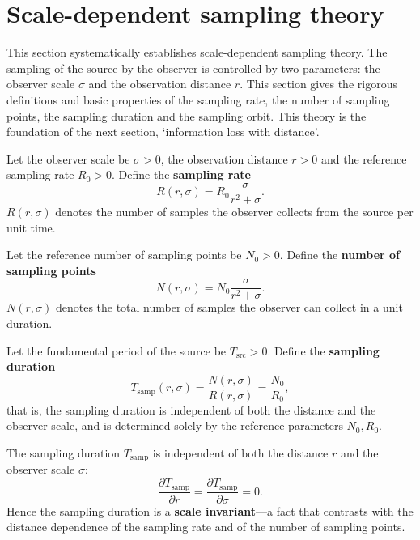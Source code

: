 \section{Scale-dependent sampling theory}
\label{sec:dyn_sampling}

This section systematically establishes scale-dependent sampling theory. The sampling of the source by the observer is controlled by two parameters: the observer scale $\sigma$ and the observation distance $r$. This section gives the rigorous definitions and basic properties of the sampling rate, the number of sampling points, the sampling duration and the sampling orbit. This theory is the foundation of the next section, `information loss with distance'.

\begin{definition}\label{def:dyn_sampling_rate}
Let the observer scale be $\sigma>0$, the observation distance $r>0$ and the reference sampling rate $R_0>0$. Define the \textbf{sampling rate}
\[
R(r,\sigma)=R_0\frac{\sigma}{r^2+\sigma}.
\]
$R(r,\sigma)$ denotes the number of samples the observer collects from the source per unit time.
\end{definition}

\begin{definition}\label{def:dyn_sampling_points}
Let the reference number of sampling points be $N_0>0$. Define the \textbf{number of sampling points}
\[
N(r,\sigma)=N_0\frac{\sigma}{r^2+\sigma}.
\]
$N(r,\sigma)$ denotes the total number of samples the observer can collect in a unit duration.
\end{definition}

\begin{definition}\label{def:dyn_sampling_duration}
Let the fundamental period of the source be $T_{\text{src}}>0$. Define the \textbf{sampling duration}
\[
T_{\text{samp}}(r,\sigma)=\frac{N(r,\sigma)}{R(r,\sigma)}=\frac{N_0}{R_0},
\]
that is, the sampling duration is independent of both the distance and the observer scale, and is determined solely by the reference parameters $N_0,R_0$.
\end{definition}

\begin{proposition}\label{prop:dyn_sampling_duration_invariance}
The sampling duration $T_{\text{samp}}$ is independent of both the distance $r$ and the observer scale $\sigma$:
\[
\frac{\partial T_{\text{samp}}}{\partial r}=\frac{\partial T_{\text{samp}}}{\partial\sigma}=0.
\]
Hence the sampling duration is a \textbf{scale invariant}---a fact that contrasts with the distance dependence of the sampling rate and of the number of sampling points.
\end{proposition}

